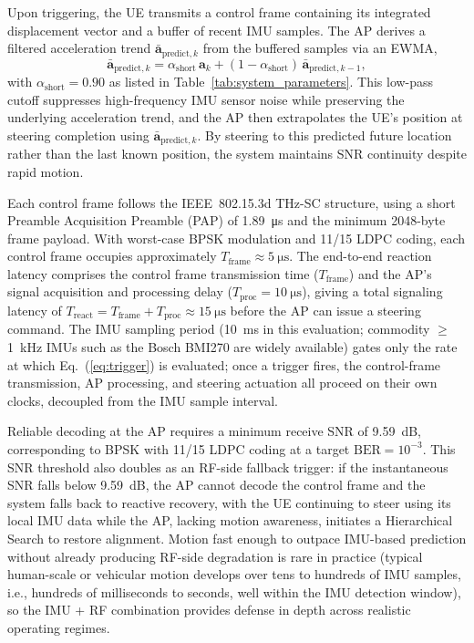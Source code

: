 \documentclass[fleqn,10pt]{wlscirep}
\newcommand{\rev}[1]{#1}
\begin{document}
Upon triggering, the UE transmits a control frame containing its integrated displacement vector and a buffer of recent IMU samples. \rev{The AP derives a filtered acceleration trend $\bar{\mathbf{a}}_{\text{predict},k}$ from the buffered samples via an EWMA,
\begin{equation}
    \bar{\mathbf{a}}_{\text{predict},k} = \alpha_{\text{short}}\, \mathbf{a}_k + (1 - \alpha_{\text{short}})\, \bar{\mathbf{a}}_{\text{predict},k-1},
    \label{eq:ewma_predict}
\end{equation}
with $\alpha_{\text{short}} = 0.90$ as listed in Table~\ref{tab:system_parameters}. This low-pass cutoff suppresses high-frequency IMU sensor noise while preserving the underlying acceleration trend, and the AP then extrapolates the UE's position at steering completion using $\bar{\mathbf{a}}_{\text{predict},k}$.} By steering to this predicted future location rather than the last known position, the system maintains SNR continuity despite rapid motion.

Each control frame follows the IEEE~802.15.3d THz-SC structure\cite{9269931}, using a short Preamble Acquisition Preamble (PAP) of \SI{1.89}{\micro\second} and the minimum 2048-byte frame payload. With worst-case BPSK modulation and 11/15 LDPC coding, each control frame occupies approximately $T_{\text{frame}} \approx \SI{5}{\micro\second}$. The end-to-end reaction latency comprises the control frame transmission time ($T_{\text{frame}}$) and the AP's signal acquisition and processing delay ($T_{\text{proc}} = \SI{10}{\micro\second}$), giving a total signaling latency of $T_{\text{react}} = T_{\text{frame}} + T_{\text{proc}} \approx \SI{15}{\micro\second}$ before the AP can issue a steering command. \rev{The IMU sampling period (\SI{10}{\milli\second} in this evaluation; commodity $\geq$\SI{1}{\kilo\hertz} IMUs such as the Bosch BMI270 are widely available) gates only the rate at which Eq.~(\ref{eq:trigger}) is evaluated; once a trigger fires, the control-frame transmission, AP processing, and steering actuation all proceed on their own clocks, decoupled from the IMU sample interval.}

Reliable decoding at the AP requires a minimum receive SNR of \SI{9.59}{\deci\bel}, corresponding to BPSK with 11/15 LDPC coding at a target $\text{BER} = 10^{-3}$. \rev{This SNR threshold also doubles as an RF-side fallback trigger:} if the instantaneous SNR falls below \SI{9.59}{\deci\bel}, the AP cannot decode the control frame and the system falls back to reactive recovery, with the UE continuing to steer using its local IMU data while the AP, lacking motion awareness, initiates a Hierarchical Search to restore alignment. \rev{Motion fast enough to outpace IMU-based prediction without already producing RF-side degradation is rare in practice (typical human-scale or vehicular motion develops over tens to hundreds of IMU samples, i.e., hundreds of milliseconds to seconds, well within the IMU detection window), so the IMU + RF combination provides defense in depth across realistic operating regimes.}
\end{document}
